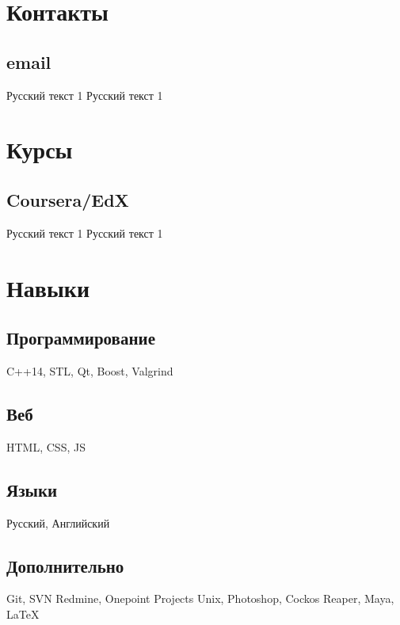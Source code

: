 \documentclass[a4paper]{curricula-vitae}
\begin{document}



\begin{minipage}[t]{0.33\textwidth} %

\section{Контакты} 

\subsection{email}
Русский текст 1
Русский текст 1

\section{Курсы}

\subsection{Coursera/EdX}
Русский текст 1
Русский текст 1

\section{Навыки}

\subsection{Программирование}
C++14, STL, Qt, Boost, Valgrind

\subsection{Веб}
HTML, CSS, JS

\subsection{Языки}

Русский, Английский

\subsection{Дополнительно}
Git, SVN
Redmine, 
Onepoint Projects
Unix, Photoshop, 
Cockos Reaper, 
Maya, \LaTeX

\end{minipage} %
\end{document}
